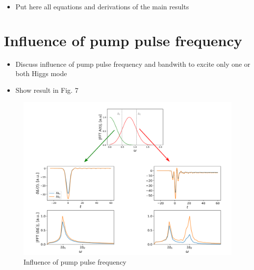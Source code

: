 \documentclass[aps,prb,reprint,noeprint,superscriptaddress]{revtex4-1}
\begin{document}
\begin{itemize}
	\item Put here all equations and derivations of the main results
\end{itemize}






\section{Influence of pump pulse frequency}
\label{sec:influence_pump_pulse_freq}

\begin{itemize}
	\item Discuss influence of pump pulse frequency and bandwith to excite only one or both Higgs mode
	\item Show result in Fig. 7
\end{itemize}

\begin{figure}[H]
    \centering
    \includegraphics[width=\columnwidth]{figures/influence_pump_pulse_freq.png}
    \caption{\label{fig:influence_pump_pulse_freq}%
    Influence of pump pulse frequency}
\end{figure}%
\end{document}
